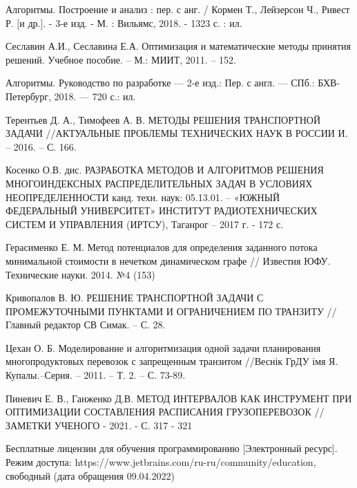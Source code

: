 \begin{thebibliography}{}
	  Алгоритмы. Построение и анализ : пер. с анг. / Кормен Т., Лейзерсон Ч., Ривест Р. [и др.]. - 3-е изд. - М. : Вильямс, 2018. - 1323 с. : ил.
	
	 Сеславин А.И., Сеславина Е.А. Оптимизация и математические методы принятия решений. Учебное пособие. – М.: МИИТ, 2011. – 152. 
	
	 Алгоритмы. Руководство по разработке --- 2-е изд.: Пер. с англ. --- СПб.: БХВ-Петербург, 2018. --- 720 с.: ил.
	
	 Терентьев Д. А., Тимофеев А. В. МЕТОДЫ РЕШЕНИЯ ТРАНСПОРТНОЙ ЗАДАЧИ //АКТУАЛЬНЫЕ ПРОБЛЕМЫ ТЕХНИЧЕСКИХ НАУК В РОССИИ И. – 2016. – С. 166.
	
	 Косенко О.В. дис. РАЗРАБОТКА МЕТОДОВ И АЛГОРИТМОВ РЕШЕНИЯ МНОГОИНДЕКСНЫХ РАСПРЕДЕЛИТЕЛЬНЫХ ЗАДАЧ В УСЛОВИЯХ НЕОПРЕДЕЛЕННОСТИ канд. техн. наук: 05.13.01. -- «ЮЖНЫЙ ФЕДЕРАЛЬНЫЙ УНИВЕРСИТЕТ» ИНСТИТУТ РАДИОТЕХНИЧЕСКИХ СИСТЕМ И УПРАВЛЕНИЯ (ИРТСУ), Таганрог -- 2017 г. - 172 с.
	
	 Герасименко Е. М. Метод потенциалов для определения заданного потока минимальной стоимости в нечетком динамическом графе // Известия ЮФУ. Технические науки. 2014. №4 (153)
	
	 Кривопалов В. Ю. РЕШЕНИЕ ТРАНСПОРТНОЙ ЗАДАЧИ С ПРОМЕЖУТОЧНЫМИ ПУНКТАМИ И ОГРАНИЧЕНИЕМ ПО ТРАНЗИТУ //Главный редактор СВ Симак. – С. 28.
	
	 Цехан О. Б. Моделирование и алгоритмизация одной задачи планирования многопродуктовых перевозок с запрещенным транзитом //Веснік ГрДУ імя Я. Купалы.–Серия. – 2011. – Т. 2. – С. 73-89.
	
	  Пиневич Е. В., Ганженко Д.В. МЕТОД ИНТЕРВАЛОВ КАК ИНСТРУМЕНТ ПРИ ОПТИМИЗАЦИИ СОСТАВЛЕНИЯ РАСПИСАНИЯ ГРУЗОПЕРЕВОЗОК // ЗАМЕТКИ УЧЕНОГО - 2021. - С. 317 - 321
	
	 Бесплатные лицензии для обучения программированию [Электронный ресурс]. Режим доступа: https://www.jetbrains.com/ru-ru/community/education, свободный (дата обращения 09.04.2022)
	
\end{thebibliography}
\endgroup

\pagebreak